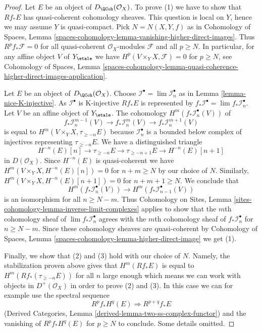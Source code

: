 \begin{proof}
Let $E$ be an object of $D_\QCoh(\mathcal{O}_X)$.
To prove (1) we have to show that $Rf_*E$ has quasi-coherent
cohomology sheaves. This question is local on $Y$, hence we may
assume $Y$ is quasi-compact. Pick $N = N(X, Y, f)$ as in
Cohomology of Spaces, Lemma
\ref{spaces-cohomology-lemma-vanishing-higher-direct-images}.
Thus $R^pf_*\mathcal{F} = 0$ for all quasi-coherent $\mathcal{O}_X$-modules
$\mathcal{F}$ and all $p \geq N$. In particular, for any affine
object $V$ of $Y_\etale$ we have $H^p(V \times_Y X, \mathcal{F}) = 0$
for $p \geq N$, see
Cohomology of Spaces, Lemma
\ref{spaces-cohomology-lemma-quasi-coherence-higher-direct-images-application}.

\medskip\noindent
Let $E$ be an object of $D_\QCoh(\mathcal{O}_X)$.
Choose $\mathcal{I}^\bullet = \lim \mathcal{I}_n^\bullet$
as in Lemma \ref{lemma-nice-K-injective}.
As $\mathcal{I}^\bullet$ is K-injective $Rf_*E$ is represented by
$f_*\mathcal{I}^\bullet = \lim f_*\mathcal{I}_n^\bullet$.
Let $V$ be an affine object of $Y_\etale$. The cohomology
$H^m(f_*\mathcal{I}_n^\bullet(V))$ of
$$
f_*\mathcal{I}_n^{m - 1}(V) \to
f_*\mathcal{I}_n^m(V) \to
f_*\mathcal{I}_n^{m + 1}(V)
$$
is equal to $H^m(V \times_Y X, \tau_{\geq -n}E)$ because
$\mathcal{I}_n^\bullet$ is a bounded below complex of injectives
representing $\tau_{\geq -n}E$. We have a distinguished triangle
$$
H^{-n}(E)[n] \to \tau_{\geq -n}E \to \tau_{\geq - n + 1}E \to H^{-n}(E)[n + 1]
$$
in $D(\mathcal{O}_X)$. Since $H^{-n}(E)$ is quasi-coherent we have
$H^m(V \times_Y X, H^{-n}(E)[n]) = 0$ for $n + m \geq N$ by
our choice of $N$. Similarly, $H^m(V \times_Y X, H^{-n}(E)[n + 1]) = 0$
for $n + m + 1 \geq N$. We conclude that
$$
H^m(f_*\mathcal{I}_n^\bullet(V)) \to H^m(f_*\mathcal{I}_{n - 1}^\bullet(V))
$$
is an isomorphism for all $n \geq N - m$. Thus
Cohomology on Sites, Lemma \ref{sites-cohomology-lemma-inverse-limit-complexes}
applies to show that the $m$th cohomology sheaf of
$\lim f_*\mathcal{I}_n^\bullet$ agrees with the $m$th cohomology
sheaf of $f_*\mathcal{I}_n^\bullet$ for $n \geq N - m$. Since these
cohomology sheaves are quasi-coherent by
Cohomology of Spaces, Lemma \ref{spaces-cohomology-lemma-higher-direct-image}
we get (1).

\medskip\noindent
Finally, we show that (2) and (3) hold with our choice of $N$.
Namely, the stabilization proven above gives that $H^m(Rf_*E)$ is equal
to $H^m(Rf_*(\tau_{\geq -n}E))$ for all $n$ large enough which means we
can work with objects in $D^+(\mathcal{O}_X)$ in order to prove (2) and (3).
In this case we can for example use the spectral sequence
$$
R^pf_*H^q(E) \Rightarrow R^{p + q}f_*E
$$
(Derived Categories, Lemma \ref{derived-lemma-two-ss-complex-functor})
and the vanishing of $R^pf_*H^q(E)$ for $p \geq N$ to conclude.
Some details omitted.
\end{proof}

